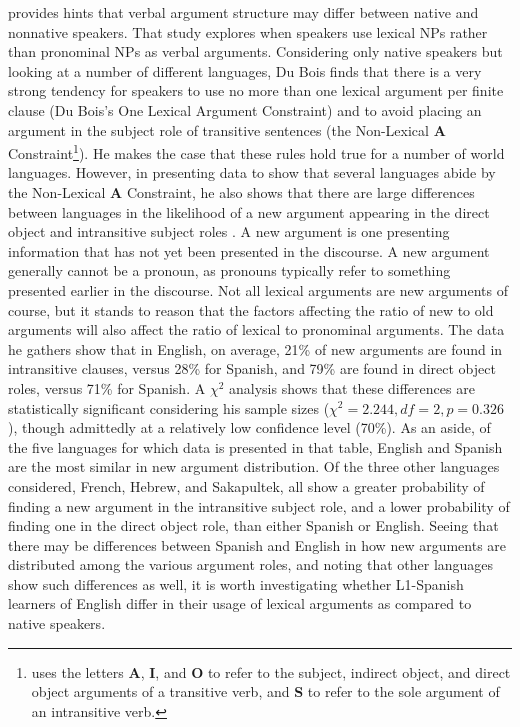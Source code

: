 \documentclass[main.tex]{subfiles}
\begin{document}
\citet{dubois:2003} provides hints that verbal argument structure may differ between native and nonnative speakers. That study explores when speakers use lexical NPs rather than pronominal NPs as verbal arguments. Considering only native speakers but looking at a number of different languages, Du Bois finds that there is a very strong tendency for speakers to use no more than one lexical argument per finite clause (Du Bois's One Lexical Argument Constraint) and to avoid placing an argument in the subject role of transitive sentences (the Non-Lexical \textbf{A} Constraint\footnote{\citet{dubois:2003} uses the letters \textbf{A}, \textbf{I}, and \textbf{O} to refer to the subject, indirect object, and direct object arguments of a transitive verb, and \textbf{S} to refer to the sole argument of an intransitive verb.}). He makes the case that these rules hold true for a number of world languages. However, in presenting data to show that several languages abide by the Non-Lexical \textbf{A} Constraint, he also shows that there are large differences between languages in the likelihood of a new argument appearing in the direct object and intransitive subject roles \citep[Table~2.5]{dubois:2003}. A new argument is one presenting information that has not yet been presented in the discourse. A new argument generally cannot be a pronoun, as pronouns typically refer to something presented earlier in the discourse. Not all lexical arguments are new arguments of course, but it stands to reason that the factors affecting the ratio of new to old arguments will also affect the ratio of lexical to pronominal arguments. The data he gathers show that in English, on average, 21\% of new arguments are found in intransitive clauses, versus 28\% for Spanish, and 79\% are found in direct object roles, versus 71\% for Spanish. A $\chi^2$ analysis shows that these differences are statistically significant considering his sample sizes ($\chi^2=2.244, df=2, p=0.326$), though admittedly at a relatively low confidence level (70\%). As an aside, of the five languages for which data is presented in that table, English and Spanish are the most similar in new argument distribution. Of the three other languages considered, French, Hebrew, and Sakapultek, all show a greater probability of finding a new argument in the intransitive subject role, and a lower probability of finding one in the direct object role, than either Spanish or English. Seeing that there may be differences between Spanish and English in how new arguments are distributed among the various argument roles, and noting that other languages show such differences as well, it is worth investigating whether L1-Spanish learners of English differ in their usage of lexical arguments as compared to native speakers.
\end{document}
